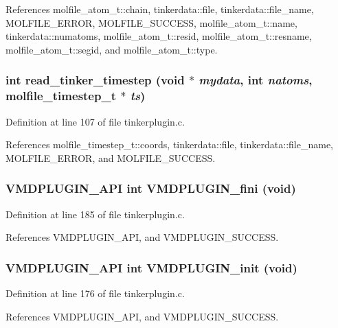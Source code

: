 References molfile\_\-atom\_\-t::chain, tinkerdata::file, tinkerdata::file\_\-name, MOLFILE\_\-ERROR, MOLFILE\_\-SUCCESS, molfile\_\-atom\_\-t::name, tinkerdata::numatoms, molfile\_\-atom\_\-t::resid, molfile\_\-atom\_\-t::resname, molfile\_\-atom\_\-t::segid, and molfile\_\-atom\_\-t::type.
\subsubsection{\setlength{\rightskip}{0pt plus 5cm}int read\_\-tinker\_\-timestep (void $\ast$ {\em mydata}, int {\em natoms}, {\bf molfile\_\-timestep\_\-t} $\ast$ {\em ts})\hspace{0.3cm}{\tt  [static]}}\label{tinkerplugin_8c_a3}




Definition at line 107 of file tinkerplugin.c.

References molfile\_\-timestep\_\-t::coords, tinkerdata::file, tinkerdata::file\_\-name, MOLFILE\_\-ERROR, and MOLFILE\_\-SUCCESS.
\subsubsection{\setlength{\rightskip}{0pt plus 5cm}VMDPLUGIN\_\-API int VMDPLUGIN\_\-fini (void)}\label{tinkerplugin_8c_a7}




Definition at line 185 of file tinkerplugin.c.

References VMDPLUGIN\_\-API, and VMDPLUGIN\_\-SUCCESS.
\subsubsection{\setlength{\rightskip}{0pt plus 5cm}VMDPLUGIN\_\-API int VMDPLUGIN\_\-init (void)}\label{tinkerplugin_8c_a5}




Definition at line 176 of file tinkerplugin.c.

References VMDPLUGIN\_\-API, and VMDPLUGIN\_\-SUCCESS.
